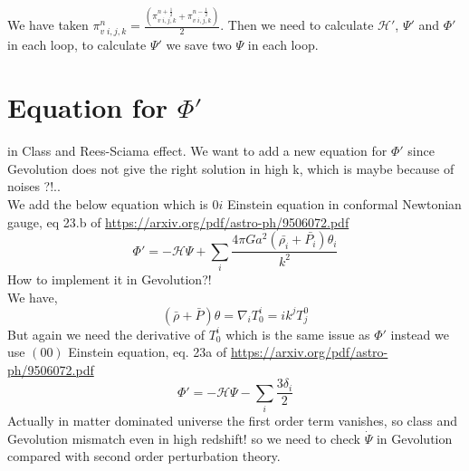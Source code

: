 \documentclass[a4paper,11pt]{article}
\def\be{\begin{equation}}
\def\ee{\end{equation}}
\begin{document}
 We have taken $\pi_{v  \; {i,j,k}}^{n} =\frac{(\pi_{v  \; {i,j,k}}^{n+\frac{1}{2}} +\pi_{v \; {i,j,k}}^{n-\frac{1}{2}} )}{2} $. Then we need to calculate $\mathcal{H}'$, ${\Psi}'$ and  ${\Phi}'$ in each loop, to calculate ${\Psi}'$ we save two $\Psi$ in each loop. \\
\section{Equation for $\Phi'$} in Class and Rees-Sciama effect.
We want to add a new equation for $\Phi'$ since Gevolution does not give the right solution in high k, which is maybe because of noises ?!..\\
We add the below equation which is $0i$ Einstein equation in conformal Newtonian gauge, eq 23.b of \url{https://arxiv.org/pdf/astro-ph/9506072.pdf}
\be
\Phi'=-\mathcal{H} \Psi+ \sum _i\frac{4 \pi G a^2 (\bar{\rho_i} + \bar{P_i}) \theta_i}{k^2}
\ee
How to implement it in Gevolution?!\\
We have,
\be
 (\bar{\rho} + \bar{P}) \theta =  \nabla_i T_0^i = i k^j T_j^0
\ee
But again we need the derivative of $T_0^i$ which is the same issue as $\Phi'$ instead we use $(00)$ Einstein equation, eq. 23a of \url{https://arxiv.org/pdf/astro-ph/9506072.pdf}
\be
\Phi'=-\mathcal{H} \Psi - \sum _i\frac{3 \delta_i} {2}
\ee
Actually in matter dominated universe the first order term vanishes, so class and Gevolution mismatch even in high redshift! so we need to check $\dot{\Psi}$ in Gevolution compared with second order perturbation theory.
\end{document}
